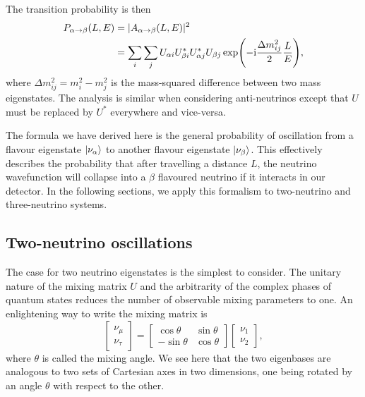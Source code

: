 The transition probability is then
\begin{align}
	\label{eq:nuprob}
	P_{\alpha \rightarrow \beta}(L, E) &= |A_{\alpha \rightarrow \beta}(L, E)|^2 \nonumber\\
	&= \sum_i \sum_j U_{\alpha i} U^*_{\beta i} U^*_{\alpha j} U_{\beta j}
	\exp(-\mathrm{i} \frac{\Delta m_{ij}^2}{2} \frac{L}{E}),
\end{align}
where $\Delta m^2_{ij} = m^2_i - m^2_j$ is the mass-squared difference between
two mass eigenstates.
The analysis is similar when considering anti-neutrinos except that $U$ must be
replaced by $U^*$ everywhere and vice-versa.

The formula we have derived here is the general probability of oscillation from a
flavour eigenstate $\ket{\nu_\alpha}$ to another flavour eigenstate
$\ket{\nu_\beta}$. This effectively describes the probability that after
travelling a distance $L$, the neutrino wavefunction will collapse into a
$\beta$ flavoured neutrino if it interacts in our detector.
In the following sections, we apply this formalism to two-neutrino and
three-neutrino systems. 



\subsection{Two-neutrino oscillations}\label{sec:twonu}
The case for two neutrino eigenstates is the simplest to consider. The
unitary nature of the mixing matrix $U$ and the arbitrarity of the complex phases
of quantum states reduces the number of observable mixing parameters to
one\cite{langacker}.
An enlightening way to write the mixing matrix is\cite{zuber} 
\begin{equation}
	\begin{bmatrix} \nu_\mu \\ \nu_\tau \end{bmatrix} =
	\begin{bmatrix} \cos\theta & \sin\theta \\
								 -\sin\theta & \cos\theta \end{bmatrix}
	\begin{bmatrix} \nu_1 \\ \nu_2 \end{bmatrix},
		\label{eq:twonumixing}
\end{equation}
where $\theta$ is called the mixing angle.
We see here that the two eigenbases are analogous to two sets of Cartesian axes
in two dimensions, one being rotated by an angle $\theta$ with respect to the
other.

